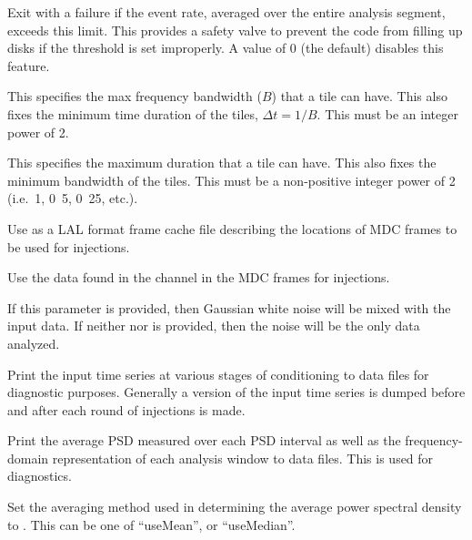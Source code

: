 \begin{entry}
\begin{entry}
\item[\option{--max-event-rate} \parm{Hz}]
Exit with a failure if the event rate, averaged over the entire analysis
segment, exceeds this limit.  This provides a safety valve to prevent the
code from filling up disks if the threshold is set improperly.  A value of
0 (the default) disables this feature.

\item[\option{--max-tileband} \parm{Hz}]
This specifies the max frequency bandwidth (\(B\)) that a tile can have.
This also fixes the minimum time duration of the tiles, $\Delta t = 1/B $.
This must be an integer power of 2.

\item[\option{--max-tileduration} \parm{s}]
This specifies the maximum duration that a tile can have.  This also fixes
the minimum bandwidth of the tiles.  This must be a non-positive integer
power of 2 (i.e.\ \unit{1}{\second}, \unit{0.5}{\second},
\unit{0.25}{\second}, etc.).

\item[\option{--mdc-cache} \parm{cache file}]
Use  as a LAL format frame cache file describing the
locations of MDC frames to be used for injections.

\item[\option{--mdc-channel} \parm{channel name}]
Use the data found in the channel  in the MDC frames for
injections.

\item[\option{--noise-amplitude} \parm{amplitude}]
If this parameter is provided, then Gaussian white noise will be mixed with
the input data.  If neither  nor 
is provided, then the noise will be the only data analyzed.

\item[\option{--printData}]
Print the input time series at various stages of conditioning to data files
for diagnostic purposes.  Generally a version of the input time series is
dumped before and after each round of injections is made.

\item[\option{--printSpectrum}]
Print the average PSD measured over each PSD interval as well as the
frequency-domain representation of each analysis window to data files.
This is used for diagnostics.

\item[\option{--psd-average-method} \parm{method}]
Set the averaging method used in determining the average power spectral
density to .  This can be one of ``useMean'', or
``useMedian''.


\end{entry}
\end{entry}
